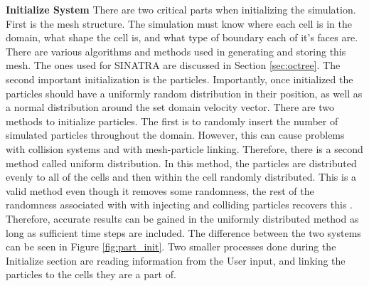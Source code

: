 \indent \textbf{Initialize System} There are two critical parts when initializing the simulation. First is the mesh structure. The simulation must know where each cell is in the domain, what shape the cell is, and what type of boundary each of it's faces are. There are various algorithms and methods used in generating and storing this mesh. The ones used for SINATRA are discussed in Section \ref{sec:octree}. The second important initialization is the particles. Importantly, once initialized the particles should have a uniformly random distribution in their position, as well as a normal distribution around the set domain velocity vector. There are two methods to initialize particles. The first is to randomly insert the number of simulated particles throughout the domain. However, this can cause problems with collision systems and with mesh-particle linking. Therefore, there is a second method called uniform distribution. In this method, the particles are distributed evenly to all of the cells and then within the cell randomly distributed. This is a valid method even though it removes some randomness, the rest of the randomness associated with with injecting and colliding particles recovers this \cite{Galvez2018a} \cite{bird_dsmc} \cite{mac_thesis}. Therefore, accurate results can be gained in the uniformly distributed method as long as sufficient time steps are included. The difference between the two systems can be seen in Figure \ref{fig:part_init}. Two smaller processes done during the Initialize section are reading information from the User input, and linking the particles to the cells they are a part of. \par

